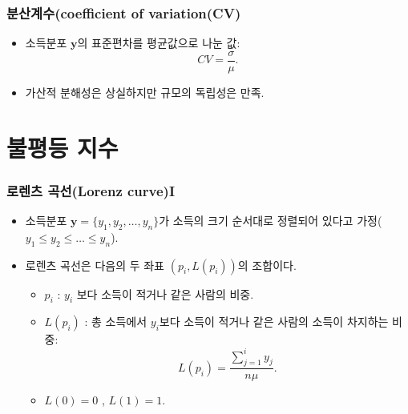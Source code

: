 \documentclass[aspectratio=169,xcolor=dvipsnames,]{beamer}
\newcommand{\y}{\mathbf{y}}
\begin{document}
\begin{frame}[<+->]
\frametitle{분산계수(coefficient of variation(CV)}
    \begin{itemize}
        \item 소득분포 $\y$의 표준편차를 평균값으로 나눈 값:
        $$ CV = \frac{\sigma}{\mu}.$$ 
        \item 가산적 분해성은 상실하지만 규모의 독립성은 만족.
    \end{itemize}
\end{frame}
\section{불평등 지수} 
\begin{frame}[<+->]
\frametitle{로렌츠 곡선(Lorenz curve)I}
    \begin{itemize}
        \item 소득분포 $\mathbf{y} = \{y_1,y_2, \ldots , y_n \}$가 소득의 크기 순서대로 정렬되어 있다고 가정($y_1 \leq y_2 \leq \ldots \leq y_n$).
        \item 로렌츠 곡선은 다음의 두 좌표 $(p_i , L(p_i))$의 조합이다.
        \begin{itemize}
            \item $p_i$ : $y_i$ 보다 소득이 적거나 같은 사람의 비중.
            \item $L(p_i)$ : 총 소득에서 $y_i$보다 소득이 적거나 같은 사람의 소득이 차지하는 비중: 
                $$L(p_i) = \frac{\sum ^i _{j=1} y _j}{n \mu}.$$
            \item $L(0) = 0$ , $L(1) = 1$.
        \end{itemize}
        
    \end{itemize}
\end{frame}
\end{document}
